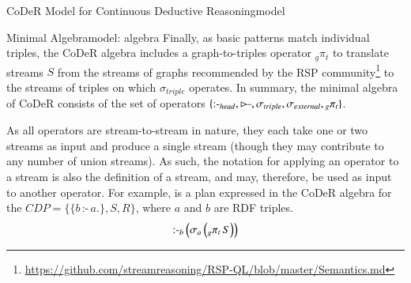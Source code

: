 \begin{nestedsection}{CoDeR Model for Continuous Deductive Reasoning}{model}
\begin{nestedsection}{Minimal Algebra}{model: algebra}
		Finally, as basic patterns match individual triples, the CoDeR algebra includes a graph-to-triples operator ${{}_g\pi_t}$ to translate streams $S$ from the streams of graphs recommended by the RSP community\footnote{\url{https://github.com/streamreasoning/RSP-QL/blob/master/Semantics.md}} to the streams of triples on which $\sigma_{triple}$ operates.
		In summary, the minimal algebra of CoDeR consists of the set of operators ${\{\text{:-}_{head}, \rstreamjoin, \sigma_{triple}, \sigma_{external}, {}_g{\pi_t}\}}$.

		As all operators are stream-to-stream in nature, they each take one or two streams as input and produce a single stream (though they may contribute to any number of union streams).
		As such, the notation for applying an operator to a stream is also the definition of a stream, and may, therefore, be used as input to another operator.
		For example,  is a plan expressed in the CoDeR algebra for the ${CDP = \{ \{b\,\text{:-}\,a.\}, S, R \}}$, where $a$ and $b$ are RDF triples.
		\begin{equation}\labeleqn{basic-example-plan}
			\text{:-}_b \left( \sigma_a \left( {}_g{\pi_t}\,S \right) \right)
		\end{equation}


\end{nestedsection}
\end{nestedsection}
